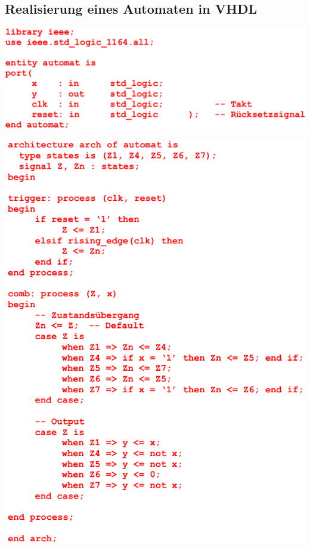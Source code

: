 \documentclass[a5paper,12pt,twoside]{scrartcl}
\begin{document}
\subsection{Realisierung eines Automaten in VHDL}

\begin{minipage}{.5\linewidth}
  \includegraphics[width=\textwidth]{Automat_Entity}
\end{minipage}%
\begin{minipage}{.5\linewidth}
  \includegraphics[width=\textwidth]{Automat_Architecture}
\end{minipage}
\end{document}
